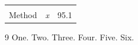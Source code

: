 \documentclass{article}
\begin{document}
\begin{tabular}{l>{\itshape}cr}
\cite{b,a} & \cite{c} & \cite{d,e,f} \\
Method \cite{a} & x\cite{b} & 95.1
\end{tabular}

\begin{thebibliography}{9}
 One.
 Two.
 Three.
 Four.
 Five.
 Six.
\end{thebibliography}
\end{document}
